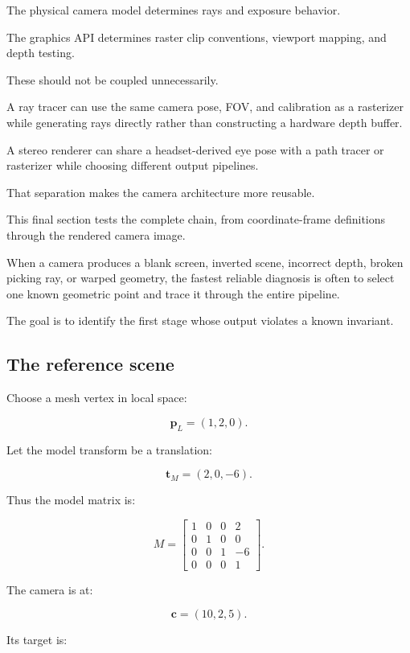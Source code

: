 The physical camera model determines rays and exposure behavior.

The graphics API determines raster clip conventions, viewport mapping, and depth testing.

These should not be coupled unnecessarily.

A ray tracer can use the same camera pose, FOV, and calibration as a rasterizer while generating rays directly rather than constructing a hardware depth buffer.

A stereo renderer can share a headset-derived eye pose with a path tracer or rasterizer while choosing different output pipelines.

That separation makes the camera architecture more reusable.

This final section tests the complete chain, from coordinate-frame definitions through the rendered camera image.

When a camera produces a blank screen, inverted scene, incorrect depth, broken picking ray, or warped geometry, the fastest reliable diagnosis is often to select one known geometric point and trace it through the entire pipeline.

The goal is to identify the first stage whose output violates a known invariant.

\subsection{The reference scene}\label{02-foundations-ii-ch037-the-reference-scene}

\hypertarget{02-foundations-ii-ch037-the-reference-scene}{}

Choose a mesh vertex in local space:

\[ \boxed{ \mathbf p_L=(1,2,0). } \]

Let the model transform be a translation:

\[ \boxed{ \mathbf t_M=(2,0,-6). } \]

Thus the model matrix is:

\[ M= \begin{bmatrix} 1&0&0&2\\ 0&1&0&0\\ 0&0&1&-6\\ 0&0&0&1 \end{bmatrix}. \]

The camera is at:

\[ \boxed{ \mathbf c=(10,2,5). } \]

Its target is:

